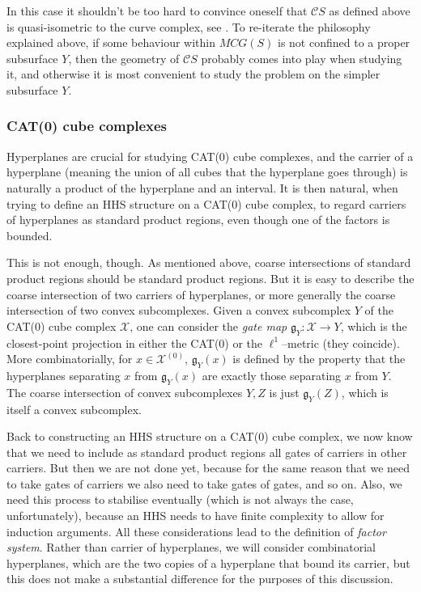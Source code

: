\documentclass[11pt,oneside]{amsart}
\theoremstyle{definition}
\newcommand{\cuco}[1]{{\mathcal #1}}
\newcommand{\fontact}{{\mathcal C}}
\newcommand{\gate}{\mathfrak g}
\begin{document}
In this case it shouldn't be too hard to convince oneself that $\fontact S$ as defined above is quasi-isometric to the curve complex, see \cite[]{MM1}. To re-iterate the philosophy explained above, if some behaviour within $MCG(S)$ is not confined to a proper subsurface $Y$, then the geometry of $\fontact S$ probably comes into play when studying it, and otherwise it is most convenient to study the problem on the simpler subsurface $Y$.


\subsubsection{CAT(0) cube complexes}

Hyperplanes are crucial for studying CAT(0) cube complexes, and the carrier of a hyperplane (meaning the union of all cubes that the hyperplane goes through) is naturally a product of the hyperplane and an interval. It is then natural, when trying to define an HHS structure on a CAT(0) cube complex, to regard carriers of hyperplanes as standard product regions, even though one of the factors is bounded.

This is not enough, though. As mentioned above, coarse intersections of standard product regions should be standard product regions. But it is easy to describe the coarse intersection of two carriers of hyperplanes, or more generally the coarse intersection of two convex subcomplexes. Given a convex subcomplex $Y$ of the CAT(0) cube complex $\cuco X$, one can consider the \emph{gate map} $\gate_Y:\cuco X\to Y$, which is the closest-point projection in either the CAT(0) or the $\ell^1$--metric (they coincide). More combinatorially, for $x\in\cuco X^{(0)}$, $\gate_Y(x)$ is defined by the property that the hyperplanes separating $x$ from $\gate_Y(x)$ are exactly those separating $x$ from $Y$. The coarse intersection of convex subcomplexes $Y,Z$ is just $\gate_Y(Z)$, which is itself a convex subcomplex.

Back to constructing an HHS structure on a CAT(0) cube complex, we now know that we need to include as standard product regions all gates of carriers in other carriers. But then we are not done yet, because for the same reason that we need to take gates of carriers we also need to take gates of gates, and so on. Also, we need this process to stabilise eventually (which is not always the case, unfortunately), because an HHS needs to have finite complexity to allow for induction arguments. All these considerations lead to the definition of \emph{factor system}. Rather than carrier of hyperplanes, we will consider combinatorial hyperplanes, which are the two copies of a hyperplane that bound its carrier, but this does not make a substantial difference for the purposes of this discussion.
\end{document}
